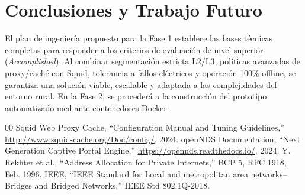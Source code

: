 \documentclass[conference]{IEEEtran}
\begin{document}
\section{Conclusiones y Trabajo Futuro}
El plan de ingeniería propuesto para la Fase 1 establece las bases técnicas completas para responder a los criterios de evaluación de nivel superior (\textit{Accomplished}). Al combinar segmentación estricta L2/L3, políticas avanzadas de proxy/caché con Squid, tolerancia a fallos eléctricos y operación 100\% offline, se garantiza una solución viable, escalable y adaptada a las complejidades del entorno rural. En la Fase 2, se procederá a la construcción del prototipo automatizado mediante contenedores Docker.

\begin{thebibliography}{00}
 Squid Web Proxy Cache, ``Configuration Manual and Tuning Guidelines,'' \url{http://www.squid-cache.org/Doc/config/}, 2024.
 openNDS Documentation, ``Next Generation Captive Portal Engine,'' \url{https://opennds.readthedocs.io/}, 2024.
 Y. Rekhter et al., ``Address Allocation for Private Internets,'' BCP 5, RFC 1918, Feb. 1996.
 IEEE, ``IEEE Standard for Local and metropolitan area networks--Bridges and Bridged Networks,'' IEEE Std 802.1Q-2018.
\end{thebibliography}
\end{document}
